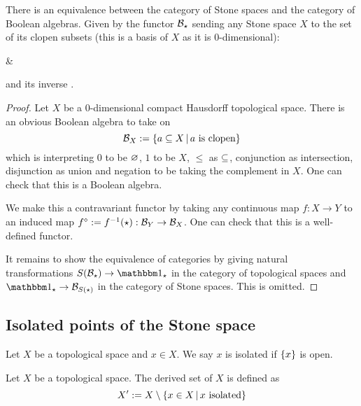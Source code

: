 \begin{prop}%
    There is an equivalence between the category of Stone
    spaces and the category of Boolean algebras.
    Given by the functor $\mathcal{B}_\star$ 
    sending any Stone space $X$ to the set of 
    its clopen subsets (this is a basis of $X$ as it is $0$-dimensional):
    \begin{cd}
           
        &  
    \end{cd}
    and its inverse .
\end{prop}
\begin{proof}
    Let $X$ be a $0$-dimensional compact Hausdorff topological space.
    There is an obvious Boolean algebra to take on 
    \[\mathcal{B}_X := \left\{a \subseteq X \,|\, a \text{ is clopen}\right\}\]
    which is interpreting $0$ to be $\varnothing$, $1$ to be $X$, 
    $\leq$ as $\subseteq$,
    conjunction as intersection, disjunction as union and negation to be 
    taking the complement in $X$.
    One can check that this is a Boolean algebra.

    We make this a contravariant functor by taking any continuous map 
    $f : X \to Y$
    to an induced map $f^{\diamond}:= f^{-1}(\star):\mathcal{B}_Y \to \mathcal{B}_X$.
    One can check that this is a well-defined functor.

    It remains to show the equivalence of categories by giving 
    natural transformations $S(\BB_{\star}) \to \id{\star}$ in
    the category of topological spaces
    and $\id{\star} \to \BB_{S(\star)}$ in the category of Stone spaces.
    This is omitted.
\end{proof}

\subsection{Isolated points of the Stone space}
\begin{dfn}
    Let $X$ be a topological space and $x \in X$. 
    We say $x$ is isolated if $\left\{x\right\}$ is open.
\end{dfn}

\begin{dfn}
    Let $X$ be a topological space. 
    The derived set of $X$ is defined as
    \[X' : = X \setminus \left\{x \in X \,|\, x \text{ isolated}\right\}\]
\end{dfn}

